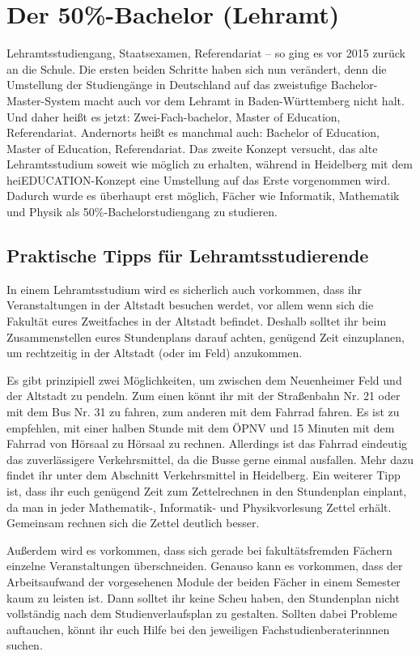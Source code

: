 

\section{Der 50\%-Bachelor (Lehramt)} %
\label{lehramt_allg}

Lehramtsstudiengang, Staatsexamen, Referendariat -- so ging es vor 2015 zurück an die Schule. Die ersten beiden Schritte haben sich nun verändert, denn die Umstellung der Studiengänge in Deutschland auf das zweistufige Bachelor-Master-System macht auch vor dem Lehramt in Baden-Württemberg nicht halt. Und daher heißt es jetzt: Zwei-Fach-bachelor, Master of Education, Referendariat. Andernorts heißt es manchmal auch: Bachelor of Education, Master of Education, Referendariat. Das zweite Konzept versucht, das alte Lehramtsstudium soweit wie möglich zu erhalten, während in Heidelberg mit dem heiEDUCATION-Konzept eine Umstellung auf das Erste vorgenommen wird. Dadurch wurde es überhaupt erst möglich, Fächer wie Informatik, Mathematik und Physik als 50\%-Bachelorstudiengang zu studieren.

\subsection{Praktische Tipps für Lehramtsstudierende}
In einem Lehramtsstudium wird es sicherlich auch vorkommen, dass ihr Veranstaltungen in der Altstadt besuchen werdet, vor allem wenn sich die Fakultät eures Zweitfaches in der Altstadt befindet. Deshalb solltet ihr beim Zusammenstellen eures Stundenplans darauf achten, genügend Zeit einzuplanen, um rechtzeitig in der Altstadt (oder im Feld) anzukommen.

Es gibt prinzipiell zwei Möglichkeiten, um zwischen dem Neuenheimer Feld und der Altstadt zu pendeln. Zum einen könnt ihr mit der Straßenbahn Nr. 21 oder mit dem Bus Nr. 31 zu fahren, zum anderen mit dem Fahrrad fahren. Es ist zu empfehlen, mit einer halben Stunde mit dem ÖPNV und 15 Minuten mit dem Fahrrad von Hörsaal zu Hörsaal zu rechnen. Allerdings ist das Fahrrad eindeutig das zuverlässigere Verkehrsmittel, da die Busse gerne einmal ausfallen. Mehr dazu findet ihr unter dem Abschnitt Verkehrsmittel in Heidelberg.
Ein weiterer Tipp ist, dass ihr euch genügend Zeit zum Zettelrechnen in den Stundenplan einplant, da man in jeder Mathematik-, Informatik- und Physikvorlesung Zettel erhält. Gemeinsam rechnen sich die Zettel deutlich besser.

Außerdem wird es vorkommen, dass sich gerade bei fakultätsfremden Fächern einzelne Veranstaltungen überschneiden. Genauso kann es vorkommen, dass der Arbeitsaufwand der vorgesehenen Module der beiden Fächer in einem Semester kaum zu leisten ist. Dann solltet ihr keine Scheu haben, den Stundenplan nicht vollständig nach dem Studienverlaufsplan zu gestalten. Sollten dabei Probleme auftauchen, könnt ihr euch Hilfe bei den jeweiligen Fachstudienberaterinnnen suchen.



